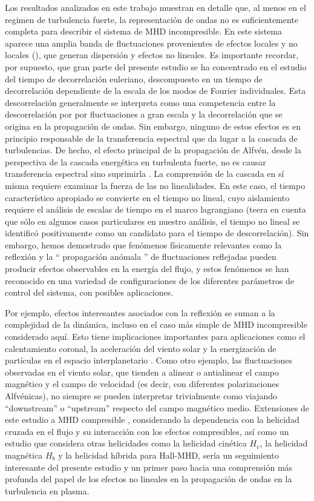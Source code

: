 Los resultados analizados en este trabajo muestran en detalle que, al
menos en el regimen de turbulencia fuerte, la representación de ondas
no es suficientemente completa para describir el sistema de MHD
incompresible. En este sistema aparece una amplia banda de
fluctuaciones provenientes de efectos locales y no locales
(\sweeping), que generan dispersión y efectos no lineales. Es
importante recordar, por supuesto, que gran parte del presente estudio
se ha concentrado en el estudio del tiempo de decorrelación euleriano,
descompuesto en un tiempo de decorrelación dependiente de la escala de
los modos de Fourier individuales. Esta descorrelación generalmente se
interpreta como una competencia entre la descorrelación por \sweeping
por fluctuaciones a gran escala y la decorrelación que se origina en
la propagación de ondas. Sin embargo, ninguno de estos efectos es en
principio responsable de la transferencia espectral que da lugar a la
cascada de turbulencias. De hecho, el efecto principal de la
propagación de Alfvén, desde la perspectiva de la cascada energética
en turbulenta fuerte, no es causar transferencia espectral sino
suprimirla \cite{shebalin_1983_anisotropy}. La comprensión de la
cascada en sí misma requiere examinar la fuerza de las no
linealidades. En este caso, el tiempo característico apropiado se
convierte en el tiempo no lineal, cuyo aislamiento requiere el
análisis de escalas de tiempo en el marco lagrangiano
\cite{kraichnan_1964_kolmogorov} (teera en cuenta que sólo en algunos
casos particulares en nuestro análisis, el tiempo no lineal se
identificó positivamente como un candidato para el tiempo de
descorrelación). Sin embargo, hemos demostrado que fenómenos
físicamente relevantes como la reflexión y la `` propagación anómala
'' de fluctuaciones reflejadas pueden producir efectos observables en
la energía del flujo, y estos fenómenos se han reconocido en una
variedad de configuraciones de los diferentes parámetros de control
del sistema, con posibles aplicaciones.

Por ejemplo, efectos interesantes asociados con la reflexión se suman
a la complejidad de la dinámica, incluso en el caso más simple de MHD
incompresible considerado aquí. Esto tiene implicaciones importantes
para aplicaciones como el calentamiento coronal, la aceleración del
viento solar y la energización de partículas en el espacio
interplanetario \cite{velli_1993_propagation, matthaeus_1999_coronal}.
Como otro ejemplo, las fluctuaciones observadas en el viento solar,
que tienden a alinear o antialinear el campo magnético y el campo de
velocidad (es decir, con diferentes polarizaciones Alfvénicas), no
siempre se pueden interpretar trivialmente como viajando
``downstream'' o ``upstream'' respecto del campo magnético medio.
Extensiones de este estudio a MHD compresible
\cite{andres_2017_interplay}, considerando la dependencia con la
helicidad cruzada en el flujo y su interacción con los efectos
compresibles, así como un estudio que considera otras helicidades como
la helicidad cinética $H_v$, la helicidad magnética $H_b$ y la
helicidad híbrida para Hall-MHD, sería un seguimiento interesante del
presente estudio y un primer paso hacia una comprensión más profunda
del papel de los efectos no lineales en la propagación de ondas en la
turbulencia en plasma.

